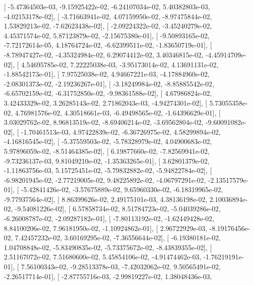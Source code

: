 \documentclass{article}
\begin{document}
       [ -5.47364503e-03,  -9.15925422e-02,  -6.24107034e-02,
          5.40382803e-03,  -4.02153178e-02],
       [ -3.71663941e-02,   4.07159950e-02,  -8.97475844e-02,
          1.53829213e-02,  -7.62623438e-02],
       [ -2.09224322e-02,  -3.45240279e-02,   4.45371574e-02,
          5.87123879e-02,  -2.15675380e-01],
       [ -9.50893165e-02,  -7.72172614e-05,   4.18764724e-02,
         -6.62399511e-02,  -1.83650719e-01],
       [ -8.78947427e-02,  -4.35324984e-02,   6.29074412e-02,
          3.40346815e-02,  -4.45914709e-02],
       [  4.54695785e-02,   7.22225038e-03,  -3.95173014e-02,
          4.13691131e-02,  -1.88542173e-01],
       [  7.97525038e-02,   4.94667221e-03,  -4.17884960e-02,
         -2.08301373e-02,  -2.19236267e-01],
       [ -3.18249984e-02,  -8.85885542e-02,  -6.65702159e-02,
         -6.31752850e-02,  -9.98361588e-02],
       [  4.67986824e-02,   3.42433329e-02,   3.26285143e-02,
          2.71862043e-03,  -4.94274301e-02],
       [  5.73055358e-02,   4.76981576e-02,   4.30518661e-03,
         -6.49498565e-02,  -1.64396629e-01],
       [  3.03029762e-02,   8.96813519e-02,  -8.69406214e-02,
         -3.69562804e-02,  -9.60091082e-02],
       [ -1.70461513e-03,   4.97422839e-02,  -6.36726975e-02,
          4.58299894e-02,  -4.16816545e-02],
       [ -5.37559503e-02,  -5.78328979e-02,   4.04900683e-02,
          5.97896059e-02,  -8.51464385e-02],
       [  6.19877660e-02,  -7.82569941e-02,  -9.73236137e-03,
          9.81049210e-02,  -1.35363265e-01],
       [  3.62801379e-02,  -1.11863756e-03,   5.15725451e-02,
         -5.79832882e-02,  -5.94822784e-02],
       [ -6.98201945e-02,  -2.77219005e-02,   9.48225892e-02,
         -4.06797291e-02,  -2.13517579e-01],
       [ -5.42841426e-02,  -3.57675889e-02,   9.65960330e-02,
         -6.18319965e-02,  -9.77937564e-02],
       [  8.86399626e-02,   2.49175101e-03,   4.38136198e-02,
          2.10036894e-02,  -9.54081226e-02],
       [  6.57858734e-02,   8.51784723e-02,  -5.04039286e-02,
         -6.26008787e-02,  -2.09287182e-01],
       [ -7.80113192e-02,  -1.62449428e-02,   8.84100206e-02,
          7.96181950e-02,  -1.10924862e-01],
       [  2.96722929e-03,  -8.19176456e-02,   7.42457232e-02,
          3.60169295e-02,  -7.36556644e-02],
       [ -6.19380181e-02,   1.04708848e-02,  -5.83490835e-02,
         -5.73375672e-02,  -8.43839355e-02],
       [  2.51167072e-02,   7.51680600e-02,   5.45854106e-02,
         -4.91474462e-03,  -1.76219191e-01],
       [  7.56100343e-02,  -9.28513378e-03,  -7.42032062e-02,
          9.50565491e-02,  -2.26517714e-01],
       [ -2.87755716e-03,  -2.99819227e-02,   1.38048436e-03,
\end{document}
